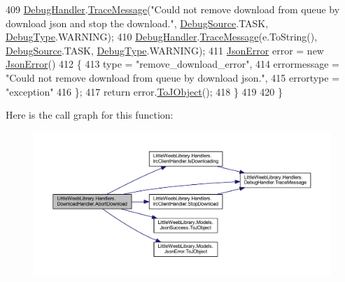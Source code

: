 \begin{DoxyCode}
409                 \mbox{\hyperlink{class_little_weeb_library_1_1_handlers_1_1_download_handler_a9f1aedadbd6f343d8de1c54724eca11e}{DebugHandler}}.\mbox{\hyperlink{interface_little_weeb_library_1_1_handlers_1_1_i_debug_handler_a2e405bc3492e683cd3702fae125221bc}{TraceMessage}}(\textcolor{stringliteral}{"Could not remove download from queue by
       download json and stop the download."}, \mbox{\hyperlink{namespace_little_weeb_library_1_1_handlers_a2a6ca0775121c9c503d58aa254d292be}{DebugSource}}.TASK, \mbox{\hyperlink{namespace_little_weeb_library_1_1_handlers_ab66019ed40462876ec4e61bb3ccb0a62}{DebugType}}.WARNING);
410                 \mbox{\hyperlink{class_little_weeb_library_1_1_handlers_1_1_download_handler_a9f1aedadbd6f343d8de1c54724eca11e}{DebugHandler}}.\mbox{\hyperlink{interface_little_weeb_library_1_1_handlers_1_1_i_debug_handler_a2e405bc3492e683cd3702fae125221bc}{TraceMessage}}(e.ToString(), 
      \mbox{\hyperlink{namespace_little_weeb_library_1_1_handlers_a2a6ca0775121c9c503d58aa254d292be}{DebugSource}}.TASK, \mbox{\hyperlink{namespace_little_weeb_library_1_1_handlers_ab66019ed40462876ec4e61bb3ccb0a62}{DebugType}}.WARNING);
411                 \mbox{\hyperlink{class_little_weeb_library_1_1_models_1_1_json_error}{JsonError}} error = \textcolor{keyword}{new} \mbox{\hyperlink{class_little_weeb_library_1_1_models_1_1_json_error}{JsonError}}()
412                 \{
413                     type = \textcolor{stringliteral}{"remove\_download\_error"},
414                     errormessage = \textcolor{stringliteral}{"Could not remove download from queue by download json."},
415                     errortype = \textcolor{stringliteral}{"exception"}
416                 \};
417                 \textcolor{keywordflow}{return} error.\mbox{\hyperlink{class_little_weeb_library_1_1_models_1_1_json_error_a0623b835bb68d5d5e1f591df6a09dd81}{ToJObject}}();
418             \}
419 
420         \}
\end{DoxyCode}
Here is the call graph for this function\+:\nopagebreak
\begin{figure}[H]
\begin{center}
\leavevmode
\includegraphics[width=350pt]{class_little_weeb_library_1_1_handlers_1_1_download_handler_a5a28664c89bf43b921fc9d3f1845b5a1_cgraph}
\end{center}
\end{figure}
